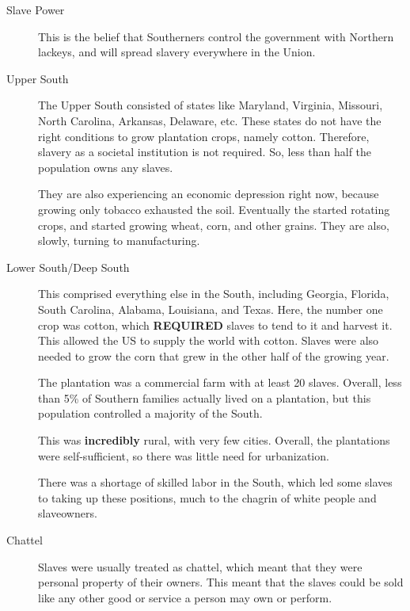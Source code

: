 \begin{description}
\item[Slave Power] This is the belief that Southerners control the government with Northern lackeys, and will spread slavery everywhere in the Union.

\item[Upper South] The Upper South consisted of states like Maryland, Virginia, Missouri, North Carolina, Arkansas, Delaware, etc.\@
  These states do not have the right conditions to grow plantation crops, namely cotton.
  Therefore, slavery as a societal institution is not required.
  So, less than half the population owns any slaves.

  They are also experiencing an economic depression right now, because growing only tobacco exhausted the soil.
  Eventually the started rotating crops, and started growing wheat, corn, and other grains.
  They are also, slowly, turning to manufacturing.

\item[Lower South/Deep South] This comprised everything else in the South, including Georgia, Florida, South Carolina, Alabama, Louisiana, and Texas.
  Here, the number one crop was cotton, which \textbf{REQUIRED} slaves to tend to it and harvest it.
  This allowed the US to supply the world with cotton.
  Slaves were also needed to grow the corn that grew in the other half of the growing year.

  The plantation was a commercial farm with at least 20 slaves.
  Overall, less than 5\% of Southern families actually lived on a plantation, but this population controlled a majority of the South.

  This was \textbf{incredibly} rural, with very few cities.
  Overall, the plantations were self-sufficient, so there was little need for urbanization.

  There was a shortage of skilled labor in the South, which led some slaves to taking up these positions, much to the chagrin of white people and slaveowners.

\item[Chattel] Slaves were usually treated as chattel, which meant that they were personal property of their owners.
  This meant that the slaves could be sold like any other good or service a person may own or perform.


\end{description}
